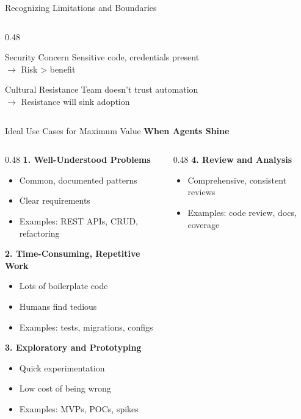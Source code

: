 \documentclass[aspectratio=169,11pt]{beamer}
\begin{document}
\begin{frame}{Recognizing Limitations and Boundaries}
\begin{columns}[T]
\begin{column}{0.48\textwidth}
            \begin{block}{Security Concern}
                Sensitive code, credentials present\\
                $\rightarrow$ Risk > benefit
            \end{block}

            \begin{block}{Cultural Resistance}
                Team doesn't trust automation\\
                $\rightarrow$ Resistance will sink adoption
            \end{block}
        \end{column}
    \end{columns}
\end{frame}

\begin{frame}{Ideal Use Cases for Maximum Value}
    \textbf{When Agents Shine}

    \begin{columns}[T]
        \begin{column}{0.48\textwidth}
            \textbf{1. Well-Understood Problems}
            \begin{itemize}
                \item Common, documented patterns
                \item Clear requirements
                \item Examples: REST APIs, CRUD, refactoring
            \end{itemize}

            \textbf{2. Time-Consuming, Repetitive Work}
            \begin{itemize}
                \item Lots of boilerplate code
                \item Humans find tedious
                \item Examples: tests, migrations, configs
            \end{itemize}

            \textbf{3. Exploratory and Prototyping}
            \begin{itemize}
                \item Quick experimentation
                \item Low cost of being wrong
                \item Examples: MVPs, POCs, spikes
            \end{itemize}
        \end{column}
        \begin{column}{0.48\textwidth}
            \textbf{4. Review and Analysis}
            \begin{itemize}
                \item Comprehensive, consistent reviews
                \item Examples: code review, docs, coverage
            \end{itemize}


\end{column}
\end{columns}
\end{frame}
\end{document}

